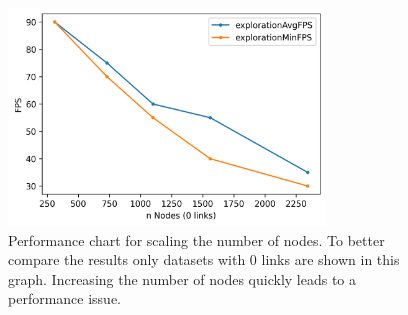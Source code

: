 \begin{table}[!hbt]
     \caption[Results from the performance evaluation.]{Results from the performance evaluation, separated into duration of the layout phase in seconds and render performance in FPS during the exploration phase. Test setup: Ryzen 7 3700X + Radeon RX 590.}
     \label{table:resultFPS}
\end{table}

\begin{figure}[!hbt]
    \centering
    \includegraphics[width=0.75\textwidth]{graphics/performanceAnalysisNodes2.png}
    \caption[Performance chart for scaling the number of nodes.]{Performance chart for scaling the number of nodes. To better compare the results only datasets with 0 links are shown in this graph. Increasing the number of nodes quickly leads to a performance issue.} 
    \label{fig:performanceNodes} 
\end{figure}

